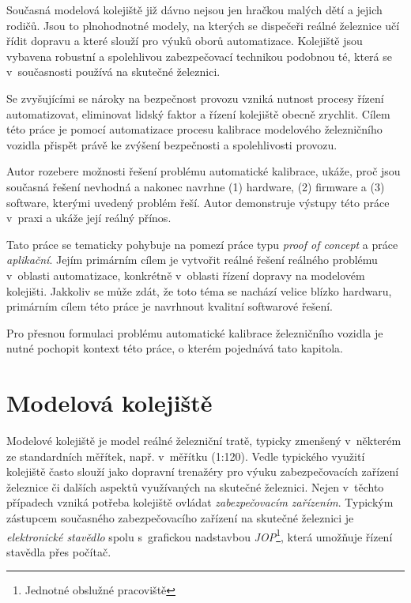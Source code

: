 Současná modelová kolejiště již dávno nejsou jen hračkou malých dětí
a jejich rodičů. Jsou to plnohodnotné modely, na kterých se dispečeři reálné
železnice učí řídit dopravu a které slouží pro výuků oborů automatizace.
Kolejiště jsou vybavena robustní a spolehlivou zabezpečovací technikou
podobnou té, která se v~současnosti používá na skutečné železnici.

Se zvyšujícími se nároky na bezpečnost provozu vzniká nutnost procesy řízení
automatizovat, eliminovat lidský faktor a řízení kolejiště obecně
zrychlit. Cílem této práce je pomocí automatizace procesu kalibrace modelového
železničního vozidla přispět právě ke zvýšení bezpečnosti a spolehlivosti
provozu.

Autor rozebere možnosti řešení problému automatické kalibrace, ukáže, proč jsou
současná řešení nevhodná a nakonec navrhne (1) hardware, (2) firmware a (3)
software, kterými uvedený problém řeší. Autor demonstruje výstupy této práce
v~praxi a ukáže její reálný přínos.

Tato práce se tematicky pohybuje na pomezí práce typu \textit{proof of concept}
a práce \textit{aplikační}. Jejím primárním cílem je vytvořit reálné řešení
reálného problému v~oblasti automatizace, konkrétně v~oblasti řízení dopravy na
modelovém kolejišti. Jakkoliv se může zdát, že toto téma se nachází velice
blízko hardwaru, primárním cílem této práce je navrhnout kvalitní softwarové
řešení.

Pro přesnou formulaci problému automatické kalibrace železničního vozidla je
nutné pochopit kontext této práce, o kterém pojednává tato kapitola.

\section{Modelová kolejiště}

Modelové kolejiště je model reálné železniční tratě, typicky zmenšený
v~některém ze standardních měřítek, např. v~měřítku  (1:120). Vedle
typického  využití kolejiště často slouží jako dopravní trenažéry pro
výuku zabezpečovacích zařízení železnice či dalších aspektů využívaných na
skutečné železnici. Nejen v~těchto případech vzniká potřeba kolejiště ovládat
\textit{zabezpečovacím zařízením}. Typickým zástupcem současného
zabezpečovacího zařízení na skutečné železnici je \textit{elektronické
stavědlo} spolu s~grafickou nadstavbou \textit{JOP}\footnote{Jednotné obslužné
pracoviště}, která umožňuje řízení stavědla přes počítač.

